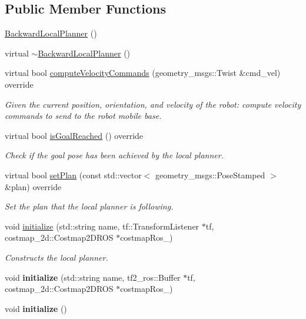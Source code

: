 \subsection*{Public Member Functions}
\begin{DoxyCompactItemize}
\item 
\hyperlink{classbackward__local__planner_1_1BackwardLocalPlanner_a54905830515c7e8ffeecdae050ce08d8}{Backward\+Local\+Planner} ()
\item 
virtual \hyperlink{classbackward__local__planner_1_1BackwardLocalPlanner_aab1430f79670f07bf21d0b796539f3e8}{$\sim$\+Backward\+Local\+Planner} ()
\item 
virtual bool \hyperlink{classbackward__local__planner_1_1BackwardLocalPlanner_ad7145b72592b48a21631befcdfbd14f0}{compute\+Velocity\+Commands} (geometry\+\_\+msgs\+::\+Twist \&cmd\+\_\+vel) override
\begin{DoxyCompactList}\small\item\em Given the current position, orientation, and velocity of the robot\+: compute velocity commands to send to the robot mobile base. \end{DoxyCompactList}\item 
virtual bool \hyperlink{classbackward__local__planner_1_1BackwardLocalPlanner_a63beb009f6c230d133ba34b16ce0b189}{is\+Goal\+Reached} () override
\begin{DoxyCompactList}\small\item\em Check if the goal pose has been achieved by the local planner. \end{DoxyCompactList}\item 
virtual bool \hyperlink{classbackward__local__planner_1_1BackwardLocalPlanner_ad2f7c554f1e107a58ac650d377646f27}{set\+Plan} (const std\+::vector$<$ geometry\+\_\+msgs\+::\+Pose\+Stamped $>$ \&plan) override
\begin{DoxyCompactList}\small\item\em Set the plan that the local planner is following. \end{DoxyCompactList}\item 
void \hyperlink{classbackward__local__planner_1_1BackwardLocalPlanner_a2892c597ff24b2b11993011f52df1570}{initialize} (std\+::string name, tf\+::\+Transform\+Listener $\ast$tf, costmap\+\_\+2d\+::\+Costmap2\+D\+R\+OS $\ast$costmap\+Ros\+\_\+)
\begin{DoxyCompactList}\small\item\em Constructs the local planner. \end{DoxyCompactList}\item 
\mbox{\label{classbackward__local__planner_1_1BackwardLocalPlanner_a548a42d0016ef3a404783aca7169cae7}} 
void {\bfseries initialize} (std\+::string name, tf2\+\_\+ros\+::\+Buffer $\ast$tf, costmap\+\_\+2d\+::\+Costmap2\+D\+R\+OS $\ast$costmap\+Ros\+\_\+)
\item 
\mbox{\label{classbackward__local__planner_1_1BackwardLocalPlanner_a49b011a3be1e39c1741c98d5dc377f55}} 
void {\bfseries initialize} ()
\end{DoxyCompactItemize}


